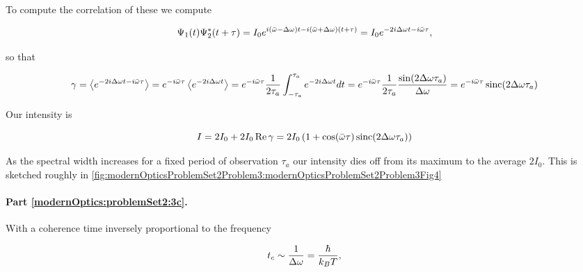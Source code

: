 {To compute the correlation of these we compute

\begin{dmath}\label{eqn:modernOptics:ProblemSet2:P3:570}
\Psi_1(t) \Psi_2^\conj(t + \tau)
= 
I_0 e^{
i (\bar{\omega} - \Delta \omega) t
-i (\bar{\omega} + \Delta \omega) (t + \tau)
}
=
I_0 e^{ -2 i \Delta \omega t - i \bar{\omega} \tau},
\end{dmath}

so that 

\begin{dmath}\label{eqn:modernOptics:ProblemSet2:P3:590}
\gamma 
= \expectation{ e^{ -2 i \Delta \omega t - i \bar{\omega} \tau} }
= e^{- i \bar{\omega} \tau }
\expectation{ e^{ -2 i \Delta \omega t } }
= e^{- i \bar{\omega} \tau }
\inv{2 \tau_a}
\int_{-\tau_a}^{\tau_a} e^{ -2 i \Delta \omega t } dt
= 
e^{- i \bar{\omega} \tau }
\inv{2 \tau_a}
\frac{\sin(2 \Delta \omega \tau_a)}{\Delta \omega }
= 
e^{- i \bar{\omega} \tau } \sinc( 2 \Delta \omega \tau_a )
\end{dmath}

Our intensity is

\begin{dmath}\label{eqn:modernOptics:ProblemSet2:P3:610}
I 
= 2 I_0 + 2 I_0 \Real \gamma
= 2 I_0 \left( 1 + \cos( \bar{\omega} \tau ) \sinc( 2 \Delta \omega \tau_a ) \right)
\end{dmath}

As the spectral width increases for a fixed period of observation $\tau_a$ our intensity dies off from its maximum to the average $2 I_0$.  This is sketched roughly in \cref{fig:modernOpticsProblemSet2Problem3:modernOpticsProblemSet2Problem3Fig4} 



\paragraph{Part \ref{modernOptics:problemSet2:3c}.  }

With a coherence time inversely proportional to the frequency

\begin{dmath}\label{eqn:modernOptics:ProblemSet2:P3:630}
t_c \sim \inv{\Delta \omega} = \frac{\hbar}{k_B T},
\end{dmath}

}
